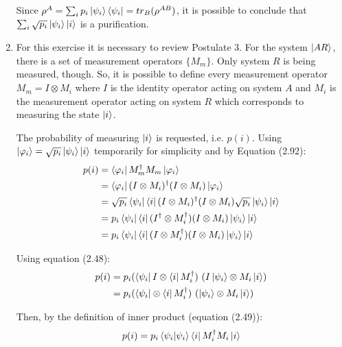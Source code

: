 \begin{enumerate}
Since $\rho^A = \sum_i p_i \ket{\psi_i}\bra{\psi_i} = tr_B(\rho^{AB})$,
it is possible to conclude that $\sum_i \sqrt{p_i} \ket{\psi_i}\ket{i}$ is a purification.


\item {}

For this exercise it is necessary to review Postulate 3. For the system $\ket{AR}$, there is a set of measurement operators $\{M_m\}$. Only system $R$ is being measured, though. So, it is possible to define every measurement operator $M_m = I \otimes M_i$ where $I$ is the identity operator acting on system $A$ and $M_i$ is the measurement operator acting on system $R$ which corresponds to measuring the state $\ket{i}$.

The probability of measuring $\ket{i}$ is requested, i.e. $p(i)$. Using $\ket{\varphi_i} = \sqrt{p_i}\ket{\psi_i} \ket{i}$ temporarily for simplicity and by Equation (2.92):
\begin{align}
    p(i) &= \bra{\varphi_i}M_m^\dagger M_m \ket{\varphi_i} \\
    &= \bra{\varphi_i}(I \otimes M_i)^\dagger (I \otimes M_i) \ket{\varphi_i} \\
    &= \sqrt{p_i} \bra{\psi_i}\bra{i}(I \otimes M_i)^\dagger
        (I \otimes M_i) \sqrt{p_i}\ket{\psi_i}\ket{i} \\
    &= p_i \bra{\psi_i}\bra{i}(I^\dagger \otimes M_i^\dagger)
        (I \otimes M_i) \ket{\psi_i}\ket{i} \\
    &= p_i \bra{\psi_i}\bra{i}(I \otimes M_i^\dagger)
        (I \otimes M_i) \ket{\psi_i}\ket{i}
\end{align}

Using equation (2.48):
\begin{align}
    p(i) &= p_i (\bra{\psi_i}I \otimes \bra{i}M_i^\dagger)
        \ (I\ket{\psi_i} \otimes M_i\ket{i}) \\
    &= p_i (\bra{\psi_i} \otimes \bra{i}M_i^\dagger )
        \ (\ket{\psi_i} \otimes M_i\ket{i})
\end{align}

Then, by the definition of inner product (equation (2.49)):
\begin{align}
    p(i) = p_i \braket{\psi_i|\psi_i} \bra{i}M_i^\dagger M_i\ket{i}
\end{align}


\end{enumerate}
